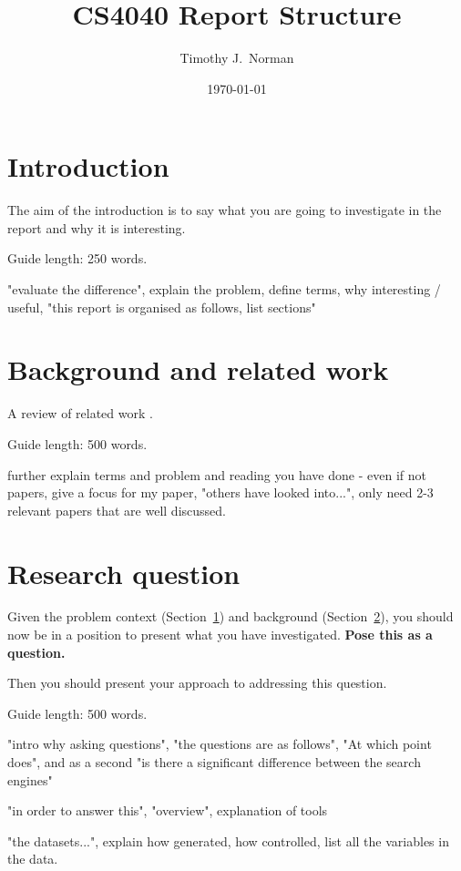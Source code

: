 \documentclass{csfourzero}
\title{CS4040 Report Structure}
\author{Timothy J.\ Norman}
\date{\today}
\begin{document}
\maketitle

\section{Introduction}
\label{sec:intro}

The aim of the introduction is to say what you are going to investigate in the report and why it
  is interesting.

Guide length: 250 words.

"evaluate the difference", explain the problem, define terms, why interesting / useful, "this report is organised as follows, list sections"


\section{Background and related work}
\label{sec:lit}

A review of related work \cite{p2pbookv2,Burnett,p2pwiki}.

Guide length: 500 words.

further explain terms and problem and reading you have done - even if not papers, give a focus for my paper, "others have looked into...", only need 2-3 relevant papers that are well discussed.

\section{Research question}
\label{sec:rq}

Given the problem context (Section~\ref{sec:intro}) and background
(Section~\ref{sec:lit}), you should now be in a position to present
what you have investigated. \textbf{Pose this as a question.}

Then you should present your approach to addressing this
question.

Guide length: 500 words.

"intro why asking questions", "the questions are as follows", "At which point does", and as a second "is there a significant difference between the search engines"

"in order to answer this", "overview", explanation of tools

"the datasets...", explain how generated, how controlled, list all the variables in the data.
\end{document}
